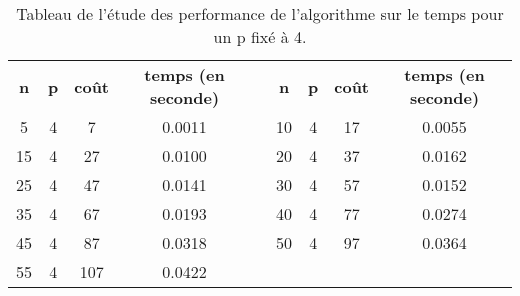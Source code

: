 \documentclass[a4paper, 12pt, french,oneside]{book}
\begin{document}
\begin{table}[!ht]
    \caption{Tableau de l'étude des performance de l'algorithme sur le temps pour un p fixé à 4. }
    \renewcommand\arraystretch{1.2}
    \begin{tabularx}{\linewidth}{|c|c|c|c|X|c|c|c|c|}
        \cline{1-4}\cline{6-9}
        {\textbf{n}} & {\textbf{p}} & {\textbf{coût}} & {\textbf{temps (en seconde)}} &  & {\textbf{n}} & {\textbf{p}} & {\textbf{coût}} & {\textbf{temps (en seconde)}} \\
        \cline{1-4}\cline{6-9}


        5            & 4            & 7               & 0.0011                        &  &

        10           & 4            & 17              & 0.0055                                                                                                           \\

        15           & 4            & 27              & 0.0100                        &  &

        20           & 4            & 37              & 0.0162                                                                                                           \\

        25           & 4            & 47              & 0.0141                        &  &

        30           & 4            & 57              & 0.0152                                                                                                           \\

        35           & 4            & 67              & 0.0193                        &  &

        40           & 4            & 77              & 0.0274                                                                                                           \\

        45           & 4            & 87              & 0.0318                        &  &

        50           & 4            & 97              & 0.0364                                                                                                           \\

        55           & 4            & 107             & 0.0422                        &  &


\end{tabularx}
\end{table}
\end{document}
